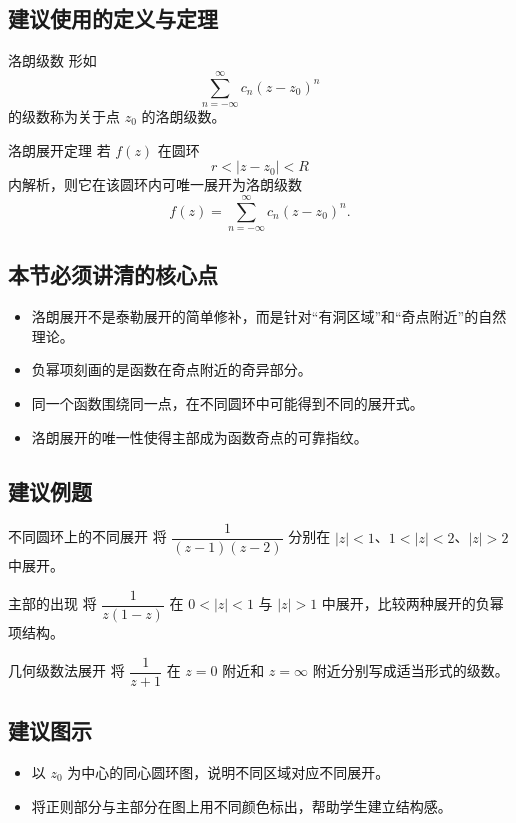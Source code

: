 \subsection*{建议使用的定义与定理}
\begin{dingliyi}{洛朗级数}{}
形如
\[
    \sum_{n=-\infty}^{\infty} c_n (z-z_0)^n
\]
的级数称为关于点 $z_0$ 的洛朗级数。
\end{dingliyi}

\begin{dingli}{洛朗展开定理}{}
若 $f(z)$ 在圆环
\[
    r < |z-z_0| < R
\]
内解析，则它在该圆环内可唯一展开为洛朗级数
\[
    f(z)=\sum_{n=-\infty}^{\infty} c_n (z-z_0)^n.
\]
\end{dingli}

\subsection*{本节必须讲清的核心点}
\begin{itemize}
    \item 洛朗展开不是泰勒展开的简单修补，而是针对``有洞区域''和``奇点附近''的自然理论。
    \item 负幂项刻画的是函数在奇点附近的奇异部分。
    \item 同一个函数围绕同一点，在不同圆环中可能得到不同的展开式。
    \item 洛朗展开的唯一性使得主部成为函数奇点的可靠指纹。
\end{itemize}

\subsection*{建议例题}
\begin{lizi}{不同圆环上的不同展开}{}
将 $\dfrac{1}{(z-1)(z-2)}$ 分别在 $|z|<1$、$1<|z|<2$、$|z|>2$ 中展开。
\end{lizi}

\begin{lizi}{主部的出现}{}
将 $\dfrac{1}{z(1-z)}$ 在 $0<|z|<1$ 与 $|z|>1$ 中展开，比较两种展开的负幂项结构。
\end{lizi}

\begin{lizi}{几何级数法展开}{}
将 $\dfrac{1}{z+1}$ 在 $z=0$ 附近和 $z=\infty$ 附近分别写成适当形式的级数。
\end{lizi}

\subsection*{建议图示}
\begin{itemize}
    \item 以 $z_0$ 为中心的同心圆环图，说明不同区域对应不同展开。
    \item 将正则部分与主部分在图上用不同颜色标出，帮助学生建立结构感。
\end{itemize}


